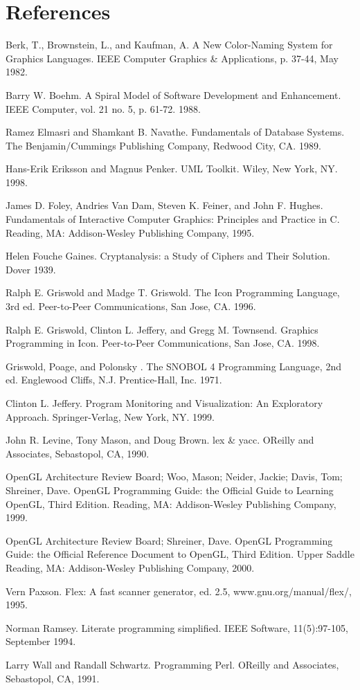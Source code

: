 \clearpage\section{References}
Berk, T., Brownstein, L., and Kaufman, A. A New Color-Naming System for
Graphics Languages. IEEE Computer Graphics \& Applications, p. 37-44,
May 1982.

Barry W. Boehm. A Spiral Model of Software Development and Enhancement.
IEEE Computer, vol. 21 no. 5, p. 61-72. 1988.

Ramez Elmasri and Shamkant B. Navathe. Fundamentals of Database Systems.
The Benjamin/Cummings Publishing Company, Redwood City, CA. 1989.

Hans-Erik Eriksson and Magnus Penker. UML Toolkit. Wiley, New York, NY.
1998.

James D. Foley, Andries Van Dam, Steven K. Feiner, and John F. Hughes.
Fundamentals of Interactive Computer Graphics: Principles and Practice
in C. Reading, MA: Addison-Wesley Publishing Company, 1995.

Helen Fouche Gaines. {\textquotedbl}Cryptanalysis: a Study of Ciphers
and Their Solution{\textquotedbl}. Dover 1939.

Ralph E. Griswold and Madge T. Griswold. The Icon Programming Language,
3rd ed. Peer-to-Peer Communications, San Jose, CA. 1996.

Ralph E. Griswold, Clinton L. Jeffery, and Gregg M. Townsend. Graphics
Programming in Icon. Peer-to-Peer Communications, San Jose, CA. 1998.

Griswold, Poage, and Polonsky . The SNOBOL 4 Programming Language, 2nd
ed. Englewood Cliffs, N.J. Prentice-Hall, Inc. 1971.

Clinton L. Jeffery. Program Monitoring and Visualization: An Exploratory
Approach. Springer-Verlag, New York, NY. 1999.

John R. Levine, Tony Mason, and Doug Brown. lex \& yacc.
O{\textquotesingle}Reilly and Associates, Sebastopol, CA, 1990.

OpenGL Architecture Review Board; Woo, Mason; Neider, Jackie; Davis,
Tom; Shreiner, Dave. OpenGL Programming Guide: the Official Guide to
Learning OpenGL, Third Edition. Reading, MA: Addison-Wesley Publishing
Company, 1999.

OpenGL Architecture Review Board; Shreiner, Dave. OpenGL Programming
Guide: the Official Reference Document to OpenGL, Third Edition. Upper
Saddle Reading, MA: Addison-Wesley Publishing Company, 2000.

Vern Paxson. Flex: A fast scanner generator, ed. 2.5,
www.gnu.org/manual/flex/, 1995.

Norman Ramsey. Literate programming simplified. IEEE Software,
11(5):97-105, September 1994. 

Larry Wall and Randall Schwartz. Programming Perl.
O{\textquotesingle}Reilly and Associates, Sebastopol, CA, 1991.
